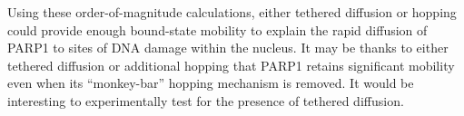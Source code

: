 %
%


Using these order-of-magnitude calculations, either tethered diffusion or hopping could provide enough bound-state mobility to explain the rapid diffusion of PARP1 to sites of DNA damage within the nucleus.  It may be thanks to either tethered diffusion or additional hopping that PARP1 retains significant mobility even when its ``monkey-bar'' hopping mechanism is removed.  It would be interesting to experimentally test for the presence of tethered diffusion.

